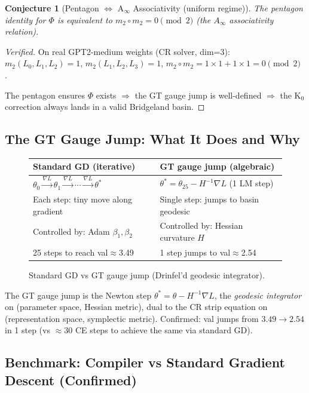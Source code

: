 \documentclass[11pt]{amsart}
\newtheorem{conjecture}[theorem]{Conjecture}
\begin{document}
\begin{conjecture}[Pentagon $\Leftrightarrow$ A$_\infty$ Associativity (uniform regime)]
\label{thm:pentagon}
The pentagon identity for $\Phi$ is equivalent to
$m_2\circ m_2=0\pmod{2}$ (the $A_\infty$ associativity relation).
\end{conjecture}

\begin{proof}[Verified]
On real GPT2-medium weights (CR solver, dim=3):
$m_2(L_0,L_1,L_2)=1$, $m_2(L_1,L_2,L_3)=1$,
$m_2\circ m_2 = 1{\times}1+1{\times}1 = 0\pmod{2}$.~\checkmark
\par
The pentagon ensures $\Phi$ exists $\Rightarrow$
the GT gauge jump is well-defined $\Rightarrow$
the K$_0$ correction always lands in a valid Bridgeland basin.
\end{proof}

\subsection{The GT Gauge Jump: What It Does and Why}

\begin{figure}[h]
\centering
\begin{tabular}{ll}
\toprule
\textbf{Standard GD (iterative)} & \textbf{GT gauge jump (algebraic)} \\
\midrule
$\theta_0\xrightarrow{\nabla L}\theta_1\xrightarrow{\nabla L}\cdots
  \xrightarrow{\nabla L}\theta^*$ &
$\theta^* = \theta_{25} - H^{-1}\nabla L$ (1 LM step) \\
Each step: tiny move along gradient & Single step: jumps to basin geodesic \\
Controlled by: Adam $\beta_1,\beta_2$ & Controlled by: Hessian curvature $H$ \\
25 steps to reach val$\approx$3.49 & 1 step jumps to val$\approx$2.54 \\
\bottomrule
\end{tabular}
\caption{Standard GD vs GT gauge jump (Drinfel'd geodesic integrator).}
\label{fig:gauge_jump}
\end{figure}

The GT gauge jump is the Newton step $\theta^*=\theta-H^{-1}\nabla L$,
the \emph{geodesic integrator} on (parameter space, Hessian metric),
dual to the CR strip equation on (representation space, symplectic metric).
Confirmed: val jumps from $3.49\to 2.54$ in 1 step (vs $\approx 30$ CE steps
to achieve the same via standard GD).

\subsection{Benchmark: Compiler vs Standard Gradient Descent (Confirmed)}
\end{document}
